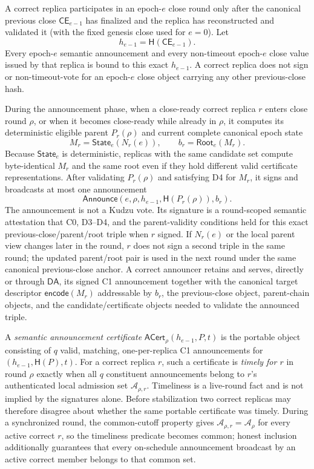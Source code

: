 \documentclass[11pt]{article}
\theoremstyle{definition}
\theoremstyle{remark}
\newcommand{\CE}{\mathsf{CE}}
\newcommand{\DA}{\mathsf{DA}}
\newcommand{\Root}{\mathsf{Root}}
\newcommand{\State}{\mathsf{State}}
\newcommand{\hash}{\mathsf{H}}
\newcommand{\Announce}{\mathsf{Announce}}
\newcommand{\ACert}{\mathsf{ACert}}
\begin{document}
\begin{description}[leftmargin=2.4em,labelindent=0em]
\item[C0 (previous-close anchor).]
A correct replica participates in an epoch-$e$ close round only after the canonical previous close $\CE_{e-1}$ has finalized and the replica has reconstructed and validated it (with the fixed genesis close used for $e=0$). Let
\[
  h_{e-1}=\hash(\CE_{e-1}).
\]
Every epoch-$e$ semantic announcement and every non-timeout epoch-$e$ close value issued by that replica is bound to this exact $h_{e-1}$. A correct replica does not sign or non-timeout-vote for an epoch-$e$ close object carrying any other previous-close hash.

\item[C1 (semantic announcement).]
During the announcement phase, when a close-ready correct replica $r$ enters close round $\rho$, or when it becomes close-ready while already in $\rho$, it computes its deterministic eligible parent $P_r(\rho)$ and current complete canonical epoch state
\[
  M_r=\State_e(N_r(e)),\qquad b_r=\Root_e(M_r).
\]
Because $\State_e$ is deterministic, replicas with the same candidate set compute byte-identical $M_r$ and the same root even if they hold different valid certificate representations. After validating $P_r(\rho)$ and satisfying D4 for $M_r$, it signs and broadcasts at most one announcement
\[
  \Announce(e,\rho,h_{e-1},\hash(P_r(\rho)),b_r).
\]
The announcement is not a Kudzu vote. Its signature is a round-scoped semantic attestation that C0, D3--D4, and the parent-validity conditions held for this exact previous-close/parent/root triple when $r$ signed. If $N_r(e)$ or the local parent view changes later in the round, $r$ does not sign a second triple in the same round; the updated parent/root pair is used in the next round under the same canonical previous-close anchor. A correct announcer retains and serves, directly or through $\DA$, its signed C1 announcement together with the canonical target descriptor $\mathsf{encode}(M_r)$ addressable by $b_r$, the previous-close object, parent-chain objects, and the candidate/certificate objects needed to validate the announced triple.

\item[C2 (relay-cutoff first vote).]
A \emph{semantic announcement certificate} $\ACert_\rho(h_{e-1},P,t)$ is the portable object consisting of $q$ valid, matching, one-per-replica C1 announcements for $(h_{e-1},\hash(P),t)$. For a correct replica $r$, such a certificate is \emph{timely for $r$} in round $\rho$ exactly when all $q$ constituent announcements belong to $r$'s authenticated local admission set $\mathcal A_{\rho,r}$. Timeliness is a live-round fact and is not implied by the signatures alone. Before stabilization two correct replicas may therefore disagree about whether the same portable certificate was timely. During a synchronized round, the common-cutoff property gives $\mathcal A_{\rho,r}=\mathcal A_\rho$ for every active correct $r$, so the timeliness predicate becomes common; honest inclusion additionally guarantees that every on-schedule announcement broadcast by an active correct member belongs to that common set.


\end{description}
\end{document}
